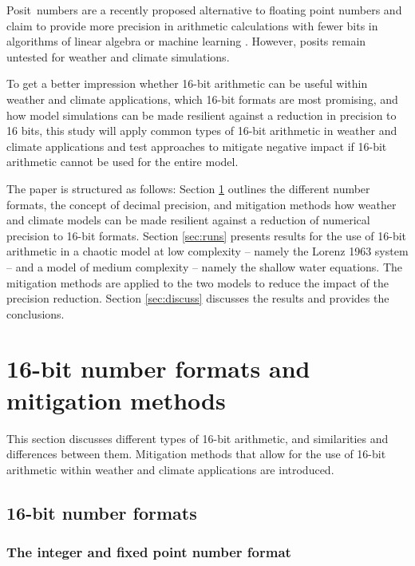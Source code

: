 \documentclass[draft]{agujournal2019}
\begin{document}
Posit\texttrademark ~numbers are a recently proposed alternative to floating point numbers and claim to provide more precision in arithmetic calculations with fewer bits in algorithms of linear algebra or machine learning \cite{Gustafson2017,Langroudi2019}. However, posits remain untested for weather and climate simulations.

To get a better impression whether 16-bit arithmetic can be useful within weather and climate applications, which 16-bit formats are most promising, and how model simulations can be made resilient against a reduction in precision to 16 bits, this study will apply common types of 16-bit arithmetic in weather and climate applications and test approaches to mitigate negative impact if 16-bit arithmetic cannot be used for the entire model.

The paper is structured as follows: Section \ref{sec:formats} outlines the different number formats, the concept of decimal precision, and mitigation methods how weather and climate models can be made resilient against a reduction of numerical precision to 16-bit formats. Section \ref{sec:runs} presents results for the use of 16-bit arithmetic in a chaotic model at low complexity -- namely the Lorenz 1963 system -- and a model of medium complexity -- namely the shallow water equations. The mitigation methods are applied to the two models to reduce the impact of the precision reduction. Section \ref{sec:discuss} discusses the results and provides the conclusions.


\section{16-bit number formats and mitigation methods}
\label{sec:formats}

This section discusses different types of 16-bit arithmetic, and similarities
and differences between them. Mitigation methods that allow for the use of 
16-bit arithmetic within weather and climate applications are introduced.

\subsection{16-bit number formats}

\subsubsection{The integer and fixed point number format}
\label{sec:integer}
\end{document}
